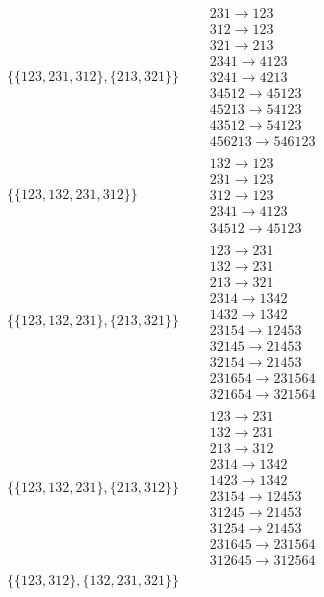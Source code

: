 \begin{tiny}
\begin{align}
\\
\{\{123, 231, 312\}, \{213, 321\}\}
\quad
&
\begin{matrix}
231 \to 123\\312 \to 123\\321 \to 213\\2341 \to 4123\\3241 \to 4213\\34512 \to 45123\\45213 \to 54123\\43512 \to 54123\\456213 \to 546123
\end{matrix}
\\
\{\{123, 132, 231, 312\}\}
\quad
&
\begin{matrix}
132 \to 123\\231 \to 123\\312 \to 123\\2341 \to 4123\\34512 \to 45123
\end{matrix}
\\
\{\{123, 132, 231\}, \{213, 321\}\}
\quad
&
\begin{matrix}
123 \to 231\\132 \to 231\\213 \to 321\\2314 \to 1342\\1432 \to 1342\\23154 \to 12453\\32145 \to 21453\\32154 \to 21453\\231654 \to 231564\\321654 \to 321564
\end{matrix}
\\
\{\{123, 132, 231\}, \{213, 312\}\}
\quad
&
\begin{matrix}
123 \to 231\\132 \to 231\\213 \to 312\\2314 \to 1342\\1423 \to 1342\\23154 \to 12453\\31245 \to 21453\\31254 \to 21453\\231645 \to 231564\\312645 \to 312564
\end{matrix}
\\
\{\{123, 312\}, \{132, 231, 321\}\}
\quad
&
\begin{matrix}

\end{matrix}
\end{align}
\end{tiny}
